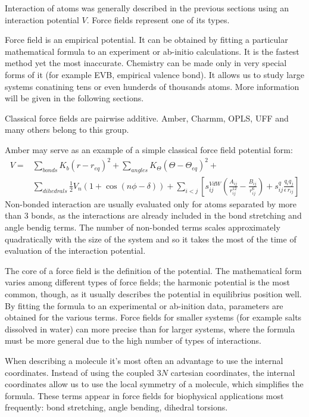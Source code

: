    Interaction of atoms was generally described in the previous sections using an interaction potential $V$. Force fields represent one of its types.

     Force field is an empirical potential. It can be obtained by fitting a particular mathematical formula to an experiment or ab-initio calculations. It is the fastest method yet the most inaccurate. Chemistry can be made only in very special forms of it (for example EVB, empirical valence bond). It allows us to study large systems conatining tens or even hunderds of thousands atoms. More information will be given in the following sections.


  Classical force fields are pairwise additive. Amber, Charmm, OPLS, UFF and many others belong to this group. 

  Amber may serve as an example of a simple classical force field potential form:
\begin{eqnarray}  \label{amber}
  V = & \displaystyle \sum _{bonds} K_b (r-r_{eq})^2 + \sum _{angles} K_\Theta (\Theta-\Theta_{eq})^2 + \\ \nonumber
      & \displaystyle \sum _{dihedrals} \frac{1}{2} V_n (1+\cos(n\phi -\delta)) + \sum _{i<j} \left [ s_{ij} ^{VdW} \left( \frac{A_{ij}}{r_{ij} ^{12}} - \frac{B_{ij}}{r_{ij} ^6} \right ) + s_{ij}^q \frac{q_i q_j}{\epsilon \, r_{ij}} \right ]
\end{eqnarray}
  Non-bonded interaction are usually evaluated only for atoms separated by more than 3 bonds, as the interactions are already included in the bond stretching and angle bendig terms. 
  The number of non-bonded terms scales approximately quadratically with the size of the system and so it takes the most of the time of evaluation of the interaction potential.

   The core of a force field is the  definition of the potential. The mathematical form varies among different types of force fields; the harmonic potential is the most common, though, as it usually describes the potential in equilibrius position well. By fitting the formula to an experimental or ab-inition data, parameters are obtained for the various terms. Force fields for smaller systems (for example salts dissolved in water) can more precise than for larger systems, where the formula must be more general due to the high number of types of interactions. 

 When describing a molecule it's most often an advantage to use the internal coordinates. Instead of using the coupled $3N$ cartesian coordinates, the internal coordinates allow us to use the local symmetry of a molecule, which simplifies the formula. 
 These terms appear in force fields for biophysical applications most frequently: 
 bond stretching, angle bending, dihedral torsions.


